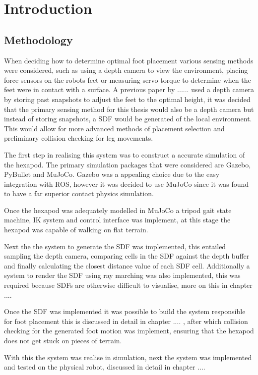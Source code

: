 \chapter{Introduction}

\section{Methodology}
When deciding how to determine optimal foot placement various sensing methods were considered, such as using a depth camera to view the environment,
placing force sensors on the robots feet or measuring servo torque to determine when the feet were in contact with a surface. A previous paper by ...... used a depth
camera by storing past snapshots to adjust the feet to the optimal height, it was decided that the primary sensing method for this thesis would also be a depth camera
but instead of storing snapshots, a \ac{SDF} would be generated of the local environment. This would allow for more advanced methods of placement selection
and preliminary collision checking for leg movements.

The first step in realising this system was to construct a accurate simulation of the hexapod. The primary simulation packages that were considered are Gazebo, PyBullet and MuJoCo.
Gazebo was a appealing choice due to the easy integration with ROS, however it was decided to use MuJoCo since it was found to have a far superior contact physics simulation.

Once the hexapod was adequately modelled in MuJoCo a tripod gait state machine, \ac{IK} system and control interface was implement, at this stage the hexapod was capable of walking
on flat terrain.

Next the the system to generate the \ac{SDF} was implemented, this entailed sampling the depth camera, comparing cells in the \ac{SDF} against the depth buffer and finally calculating
the closest distance value of each \ac{SDF} cell. Additionally a system to render the \ac{SDF} using ray marching was also implemented, this was required because \ac{SDF}s are otherwise 
difficult to visualise, more on this in chapter ....

Once the \ac{SDF} was implemented it was possible to build the system responsible for foot placement this is discussed in detail in chapter .... , after which collision checking for the generated
foot motion was implement, ensuring that the hexapod does not get stuck on pieces of terrain.

With this the system was realise in simulation, next the system was implemented and tested on the physical robot, discussed in detail in chapter ....


